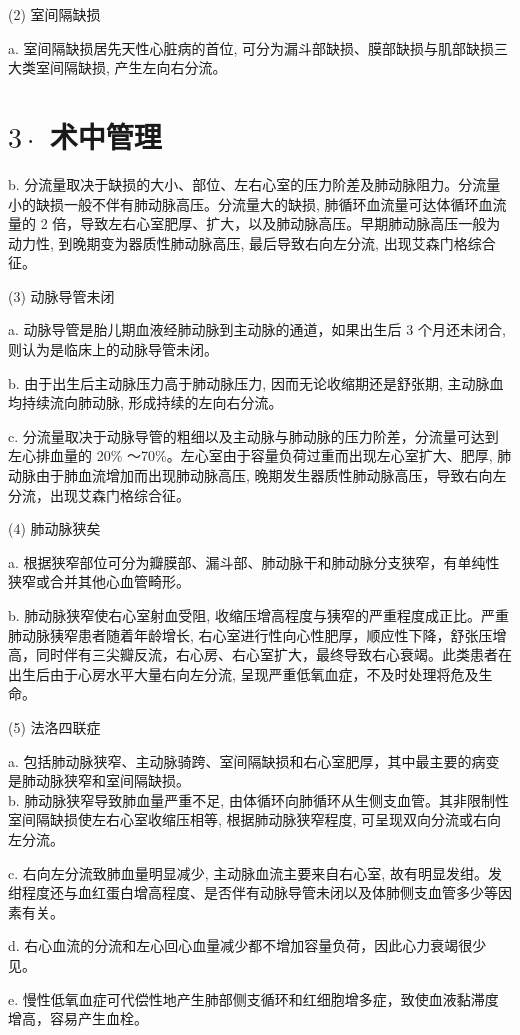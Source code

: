 \documentclass[10pt]{article}
\begin{document}
(2) 室间隔缺损

a. 室间隔缺损居先天性心脏病的首位, 可分为漏斗部缺损、膜部缺损与肌部缺损三大类室间隔缺损, 产生左向右分流。

\section*{$3 \cdot$ 术中管理}
b. 分流量取决于缺损的大小、部位、左右心室的压力阶差及肺动脉阻力。分流量小的缺损一般不伴有肺动脉高压。分流量大的缺损, 肺循环血流量可达体循环血流量的 2 倍，导致左右心室肥厚、扩大，以及肺动脉高压。早期肺动脉高压一般为动力性, 到晚期变为器质性肺动脉高压, 最后导致右向左分流, 出现艾森门格综合征。

(3) 动脉导管未闭

a. 动脉导管是胎儿期血液经肺动脉到主动脉的通道，如果出生后 3 个月还未闭合, 则认为是临床上的动脉导管未闭。

b. 由于出生后主动脉压力高于肺动脉压力, 因而无论收缩期还是舒张期, 主动脉血均持续流向肺动脉, 形成持续的左向右分流。

c. 分流量取决于动脉导管的粗细以及主动脉与肺动脉的压力阶差，分流量可达到左心排血量的 20\% ～70\%。左心室由于容量负荷过重而出现左心室扩大、肥厚, 肺动脉由于肺血流增加而出现肺动脉高压, 晚期发生器质性肺动脉高压，导致右向左分流，出现艾森门格综合征。

(4) 肺动脉狭矣

a. 根据狭窄部位可分为瓣膜部、漏斗部、肺动脉干和肺动脉分支狭窄，有单纯性狭窄或合并其他心血管畸形。

b. 肺动脉狭窄使右心室射血受阻, 收缩压增高程度与㹫窄的严重程度成正比。严重肺动脉㹫窄患者随着年龄增长, 右心室进行性向心性肥厚，顺应性下降，舒张压增高，同时伴有三尖瓣反流，右心房、右心室扩大，最终导致右心衰竭。此类患者在出生后由于心房水平大量右向左分流, 呈现严重低氧血症，不及时处理将危及生命。

(5) 法洛四联症

a. 包括肺动脉狭窄、主动脉骑跨、室间隔缺损和右心室肥厚，其中最主要的病变是肺动脉狭窄和室间隔缺损。\\
b. 肺动脉狭窄导致肺血量严重不足, 由体循环向肺循环从生侧支血管。其非限制性室间隔缺损使左右心室收缩压相等, 根据肺动脉狭窄程度, 可呈现双向分流或右向左分流。

c. 右向左分流致肺血量明显减少, 主动脉血流主要来自右心室, 故有明显发绀。发绀程度还与血红蛋白增高程度、是否伴有动脉导管未闭以及体肺侧支血管多少等因素有关。

d. 右心血流的分流和左心回心血量减少都不增加容量负荷，因此心力衰竭很少见。

e. 慢性低氧血症可代偿性地产生肺部侧支循环和红细胞增多症，致使血液黏滞度增高，容易产生血栓。
\end{document}
